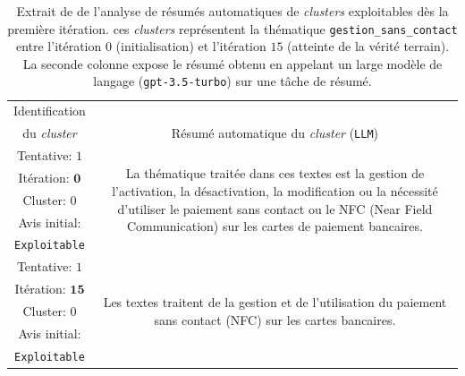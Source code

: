 			\begin{table}[!htb]
				\begin{center}
				\def\arraystretch{0.8}  %
				\begin{tabular}{|c|c|}
				
					\hline
					\rowcolor{colorTableHeader!15}
					Identification
						&
						\tabularnewline
					\rowcolor{colorTableHeader!15}
					du \textit{cluster}
						& \multirow{-2}{*}{
							Résumé automatique du \textit{cluster} (\texttt{LLM})
						}
						\tabularnewline
						\hline \hline
					
					{ \footnotesize Tentative: $1$ }
						& \multirow{5}{*}{\parbox{12cm}{
							\footnotesize La thématique traitée dans ces textes est la gestion de l'activation, la désactivation, la modification ou la nécessité d'utiliser le paiement sans contact ou le NFC (Near Field Communication) sur les cartes de paiement bancaires.
						}}
						\tabularnewline
					{ \footnotesize Itération: $\textbf{0}$ }
						&
						\tabularnewline
					{ \footnotesize Cluster: $0$ }
						&
						\tabularnewline
					{ \footnotesize Avis initial: }
						&
						\tabularnewline
					{ \footnotesize \color{colorDarkPastelGreen} \texttt{Exploitable} }
						&
						\tabularnewline
						\hline
						
					{ \footnotesize Tentative: $1$ }
						& \multirow{5}{*}{\parbox{12cm}{
							\footnotesize Les textes traitent de la gestion et de l'utilisation du paiement sans contact (NFC) sur les cartes bancaires.
						}}
						\tabularnewline
					{ \footnotesize Itération: $\textbf{15}$ }
						&
						\tabularnewline
					{ \footnotesize Cluster: $0$ }
						& 
						\tabularnewline
					{ \footnotesize Avis initial: }
						&
						\tabularnewline
					{ \footnotesize \color{colorDarkPastelGreen} \texttt{Exploitable} }
						&
						\tabularnewline
						\hline
					
				\end{tabular}
				\end{center}
				\caption{
					Extrait de de l'analyse de résumés automatiques de \textit{clusters} exploitables dès la première itération.
					ces \textit{clusters} représentent la thématique \texttt{gestion\_sans\_contact} entre l'itération $0$ (initialisation) et l'itération $15$ (atteinte de la vérité terrain).
					La seconde colonne expose le résumé obtenu en appelant un large modèle de langage (\texttt{gpt-3.5-turbo}) sur une tâche de résumé.
				}
				\label{table:4.4.3-ETUDE-PERTINENCE-RESUME-AUTOMATIQUE-GESTION-SANS-CONTACT}
			\end{table}
			
